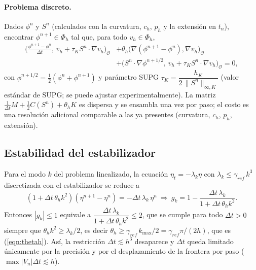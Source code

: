 \paragraph{Problema discreto.} Dados $\phi^n$ y $S^n$ (calculados con la curvatura, $c_h$, $p_h$ y la extensión en $t_n$), encontrar $\phi^{n+1}\in\Phi_h$ tal que, para todo $v_h\in\Phi_h$,
\begin{equation}
	\begin{aligned}
		\Big(\frac{\phi^{n+1}-\phi^n}{\Delta t},\,v_h+\tau_K S^n\!\cdot\!\nabla v_h\Big)_{\mathcal{O}}
		&+\theta_h\big(\nabla(\phi^{n+1}-\phi^n),\nabla v_h\big)_{\mathcal{O}}\\
		&+\Big(S^n\!\cdot\!\nabla\phi^{n+1/2},\,v_h+\tau_K S^n\!\cdot\!\nabla v_h\Big)_{\mathcal{O}}=0,
	\end{aligned}
	\label{eqn:phisemiimplicito}
\end{equation}
con $\phi^{n+1/2}=\tfrac12(\phi^{n}+\phi^{n+1})$ y parámetro SUPG $\tau_K=\dfrac{h_K}{2\,\|S^n\|_{\infty,K}}$ (valor estándar de SUPG; se puede ajustar experimentalmente). La matriz $\tfrac1{\Delta t}M+\tfrac12 C(S^n)+\theta_h K$ es dispersa y se ensambla una vez por paso; el costo es una resolución adicional comparable a las ya presentes (curvatura, $c_h$, $p_h$, extensión).

\subsection{Estabilidad del estabilizador}

Para el modo $k$ del problema linealizado, la ecuación $\eta_t=-\lambda_k\eta$ con $\lambda_k\le\gamma_{ref}\,k^3$ discretizada con el estabilizador se reduce a
\[
(1+\Delta t\,\theta_h k^2)(\eta^{n+1}-\eta^n)=-\Delta t\,\lambda_k\,\eta^n
\ \Longrightarrow\
g_k=1-\frac{\Delta t\,\lambda_k}{1+\Delta t\,\theta_h k^2}.
\]
Entonces $|g_k|\le 1$ equivale a $\dfrac{\Delta t\,\lambda_k}{1+\Delta t\,\theta_h k^2}\le 2$, que se cumple para todo $\Delta t>0$ siempre que $\theta_h k^2\ge \lambda_k/2$, es decir $\theta_h\ge \gamma_{ref}\,k_{\max}/2=\gamma_{ref}\pi/(2h)$, que es (\ref{eqn:thetah}). Así, la restricción $\Delta t\lesssim h^3$ desaparece y $\Delta t$ queda limitado únicamente por la precisión y por el desplazamiento de la frontera por paso ($\max|V_n|\Delta t\lesssim h$).

